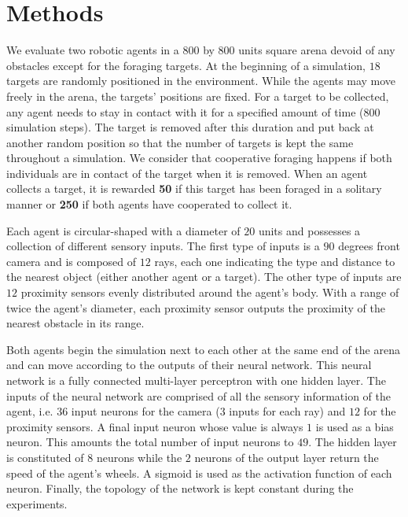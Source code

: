 \section{Methods}
\label{sec:methods}
  We evaluate two robotic agents in a $800$ by $800$ units square arena devoid of any obstacles except for the foraging targets. At the beginning of a simulation, $18$ targets are randomly positioned in the environment. While the agents may move freely in the arena, the targets' positions are fixed. For a target to be collected, any agent needs to stay in contact with it for a specified amount of time ($800$ simulation steps). The target is removed after this duration and put back at another random position so that the number of targets is kept the same throughout a simulation. We consider that cooperative foraging happens if both individuals are in contact of the target when it is removed. When an agent collects a target, it is rewarded \textbf{50} if this target has been foraged in a solitary manner or \textbf{250} if both agents have cooperated to collect it.
  
  \begin{table}[h]
    \caption{\textbf{Rewards for the foraging of targets.}
    Rewards depend on whether the targers were collected in a solitary or cooperative fashion.}
    \label{tab:Rewards}
  \end{table}

  Each agent is circular-shaped with a diameter of $20$ units and possesses a collection of different sensory inputs. The first type of inputs is a $90$ degrees front camera and is composed of $12$ rays, each one indicating the type and distance to the nearest object (either another agent or a target). The other type of inputs are $12$ proximity sensors evenly distributed around the agent's body. With a range of twice the agent's diameter, each proximity sensor outputs the proximity of the nearest obstacle in its range.

  Both agents begin the simulation next to each other at the same end of the arena and can move according to the outputs of their neural network. This neural network is a fully connected multi-layer perceptron with one hidden layer. The inputs of the neural network are comprised of all the sensory information of the agent, i.e. $36$ input neurons for the camera ($3$ inputs for each ray) and $12$ for the proximity sensors. A final input neuron whose value is always $1$ is used as a bias neuron. This amounts the total number of input neurons to $49$. The hidden layer is constituted of $8$ neurons while the $2$ neurons of the output layer return the speed of the agent's wheels. A sigmoid is used as the activation function of each neuron. Finally, the topology of the network is kept constant during the experiments.

